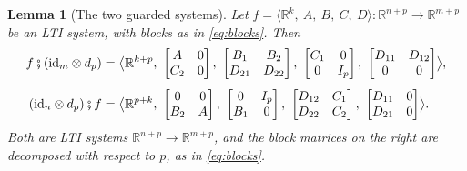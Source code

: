 \documentclass[11pt,a4paper]{article}
\theoremstyle{plain}
\newtheorem{lemma}[theorem]{Lemma}
\theoremstyle{definition}
\theoremstyle{remark}
\newcommand{\R}{\mathbb{R}}
\newcommand{\id}{\mathrm{id}}
\newcommand{\then}{\mathbin{\fatsemi}}
\newcommand{\sys}[5]{\bigl\langle #1,\ #2,\ #3,\ #4,\ #5 \bigr\rangle}
\begin{document}
\begin{lemma}[The two guarded systems]
    \label{lem:guarded}
    Let $f = \sys{\R^k}{A}{B}{C}{D} \colon \R^{n+p} \to \R^{m+p}$ be an LTI system, with blocks as in \cref{eq:blocks}.
    Then
    \begin{align}
        \label{eq:post}
        f \then (\id_m \otimes d_p)
         & = \sys{\R^{k+p}}
        {\begin{bmatrix} A & 0 \\ C_2 & 0 \end{bmatrix}}
        {\begin{bmatrix} B_1 & B_2 \\ D_{21} & D_{22} \end{bmatrix}}
        {\begin{bmatrix} C_1 & 0 \\ 0 & I_p \end{bmatrix}}
        {\begin{bmatrix} D_{11} & D_{12} \\ 0 & 0 \end{bmatrix}},
        \\[1ex]
        \label{eq:pre}
        (\id_n \otimes d_p) \then f
         & = \sys{\R^{p+k}}
        {\begin{bmatrix} 0 & 0 \\ B_2 & A \end{bmatrix}}
        {\begin{bmatrix} 0 & I_p \\ B_1 & 0 \end{bmatrix}}
        {\begin{bmatrix} D_{12} & C_1 \\ D_{22} & C_2 \end{bmatrix}}
        {\begin{bmatrix} D_{11} & 0 \\ D_{21} & 0 \end{bmatrix}} .
    \end{align}
    Both are LTI systems $\R^{n+p} \to \R^{m+p}$, and the block matrices on the right are decomposed with respect to $p$, as in \cref{eq:blocks}.
\end{lemma}
\end{document}
